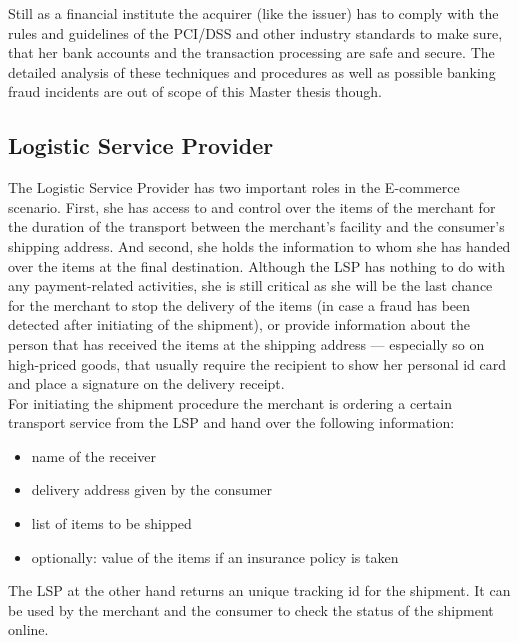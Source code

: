 Still as a financial institute the acquirer (like the issuer) has to comply with the rules and guidelines of the PCI/DSS and other industry standards to make sure, that her bank accounts and the transaction processing are safe and secure. The detailed analysis of these techniques and procedures as well as possible banking fraud incidents are out of scope of this Master thesis though.


\subsection{Logistic Service Provider}
\label{subsec:stakeholder_lsp}

The Logistic Service Provider has two important roles in the E-commerce scenario. First, she has access to and control over the items of the merchant for the duration of the transport between the merchant's facility and the consumer's shipping address. And second, she holds the information to whom she has handed over the items at the final destination. Although the \gls{LSP} has nothing to do with any payment-related activities, she is still critical as she will be the last chance for the merchant to stop the delivery of the items (in case a fraud has been detected after initiating of the shipment), or provide information about the person that has received the items at the shipping address --- especially so on high-priced goods, that usually require the recipient to show her personal id card and place a signature on the delivery receipt. \\

For initiating the shipment procedure the merchant is ordering a certain transport service from the \gls{LSP} and hand over the following information:\@

\begin{itemize}
	\item name of the receiver
	\item delivery address given by the consumer
	\item list of items to be shipped
	\item optionally: value of the items if an insurance policy is taken
\end{itemize}

The \gls{LSP} at the other hand returns an unique tracking id for the shipment. It can be used by the merchant and the consumer to check the status of the shipment online. \\

